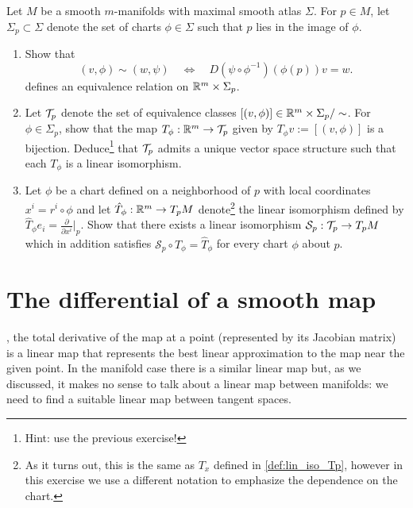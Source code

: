 \begin{exe}
Let $M$ be a smooth $m$-manifolds with maximal smooth atlas $\Sigma$.
For $p\in M$, let $\Sigma_p \subset \Sigma$ denote the set of charts $\phi\in\Sigma$ such that $p$ lies in the image of $\phi$.
\begin{enumerate}
    \item Show that
    \begin{equation}
        (v,\phi) \sim (w, \psi)
        \quad\Longleftrightarrow\quad
        D(\psi \circ \phi^{-1})(\phi(p))v = w.
    \end{equation}
    defines an equivalence relation on $\mathbb{R}^m\times\Sigma_p$.
    \item Let $\mathcal{T}_p$ denote the set of equivalence classes $[(v,\phi)]\in \mathbb{R}^m\times\Sigma_p/\sim$. For $\phi\in\Sigma_p$, show that the map $T_\phi:\mathbb{R}^m\to\mathcal{T}_p$ given by $T_\phi v := [(v,\phi)]$ is a bijection.
    Deduce\footnote{Hint: use the previous exercise!} that $\mathcal{T}_p$ admits a unique vector space structure such that each $T_\phi$ is a linear isomorphism.
    \item Let $\phi$ be a chart defined on a neighborhood of $p$ with local coordinates $x^i = r^i \circ \phi$ and let $\hat T_\phi :\mathbb{R}^m \to T_pM$ denote\footnote{As it turns out, this is the same as $T_x$ defined in \eqref{def:lin_iso_Tp}, however in this exercise we use a different notation to emphasize the dependence on the chart.} the linear isomorphism defined by $\hat T_\phi e_i = \frac{\partial}{\partial x^i}\big|_p$.
    Show that there exists a linear isomorphism $\mathcal{S}_p:\mathcal{T}_p\to T_pM$ which in addition satisfies $\mathcal{S}_p \circ T_\phi = \hat T_\phi$ for every chart $\phi$ about $p$.
\end{enumerate}
\end{exe}

\section{The differential of a smooth map}

, the total derivative of the map at a point (represented by its Jacobian matrix) is a linear map that represents the best linear approximation to the map near the given point.
In the manifold case there is a similar linear map but, as we discussed, it makes no sense to talk about a linear map between manifolds: we need to find a suitable linear map between tangent spaces.

